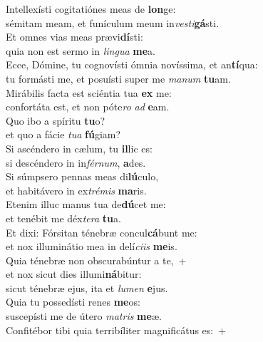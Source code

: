 \evenverse Intellexísti cogitatiónes meas de \textbf{lon}ge:~\*\\
\evenverse sémitam meam, et funículum meum in\textit{ve}\textit{sti}\textbf{gá}sti.\\
\oddverse Et omnes vias meas prævi\textbf{dí}sti:~\*\\
\oddverse quia non est sermo in \textit{lin}\textit{gua} \textbf{me}a.\\
\evenverse Ecce, Dómine, tu cognovísti ómnia novíssima, et an\textbf{tí}qua:~\*\\
\evenverse tu formásti me, et posuísti super me \textit{ma}\textit{num} \textbf{tu}am.\\
\oddverse Mirábilis facta est sciéntia tua \textbf{ex} me:~\*\\
\oddverse confortáta est, et non póte\textit{ro} \textit{ad} \textbf{e}am.\\
\evenverse Quo ibo a spíritu \textbf{tu}o?~\*\\
\evenverse et quo a fácie \textit{tu}\textit{a} \textbf{fú}giam?\\
\oddverse Si ascéndero in cælum, tu \textbf{il}lic es:~\*\\
\oddverse si descéndero in in\textit{fér}\textit{num}, \textbf{a}des.\\
\evenverse Si súmpsero pennas meas di\textbf{lú}culo,~\*\\
\evenverse et habitávero in ex\textit{tré}\textit{mis} \textbf{ma}ris.\\
\oddverse Etenim illuc manus tua de\textbf{dú}cet me:~\*\\
\oddverse et tenébit me déx\textit{te}\textit{ra} \textbf{tu}a.\\
\evenverse Et dixi: Fórsitan ténebræ concul\textbf{cá}bunt me:~\*\\
\evenverse et nox illuminátio mea in delí\textit{ci}\textit{is} \textbf{me}is.\\
\oddverse Quia ténebræ non obscurabúntur a te,~+\\
\oddverse  et nox sicut dies illumi\textbf{ná}bitur:~\*\\
\oddverse sicut ténebræ ejus, ita et \textit{lu}\textit{men} \textbf{e}jus.\\
\evenverse Quia tu possedísti renes \textbf{me}os:~\*\\
\evenverse suscepísti me de útero \textit{ma}\textit{tris} \textbf{me}æ.\\
\oddverse Confitébor tibi quia terribíliter magnificátus es:~+\\
